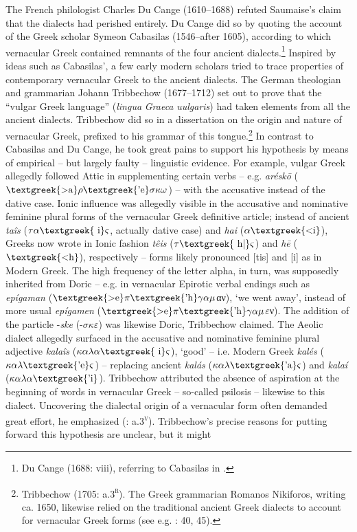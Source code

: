 \documentclass[output=paper]{langsci/langscibook}
\begin{document}
The French philologist Charles Du Cange (1610–1688) refuted Saumaise’s claim that the dialects had perished entirely. Du Cange did so by quoting the account of the Greek scholar Symeon Cabasilas (1546–after 1605), according to which vernacular Greek contained remnants of the four ancient dialects.\footnote{Du Cange (1688: viii), referring to Cabasilas in \citet[462]{Crusius1584}.} Inspired by ideas such as Cabasilas’, a few early modern scholars tried to trace properties of contemporary vernacular Greek to the ancient dialects. The German theologian and grammarian Johann Tribbechow (1677–1712) set out to prove that the “vulgar Greek language” (\textit{lingua} \textit{Graeca} \textit{uulgaris}) had taken elements from all the ancient dialects. Tribbechow did so in a dissertation on the origin and nature of vernacular Greek, prefixed to his grammar of this tongue.\footnote{Tribbechow (1705: a.3\textsc{\textsuperscript{r}}). The Greek grammarian Romanos Nikiforos, writing ca. 1650, likewise relied on the traditional ancient Greek dialects to account for vernacular Greek forms (see e.g. \citealt{Nikiforos1908}: 40, 45).} In contrast to Cabasilas and Du Cange, he took great pains to support his hypothesis by means of empirical – but largely faulty – linguistic evidence. For example, vulgar Greek allegedly followed Attic in supplementing certain verbs – e.g. \textit{aréskō} ($\text{\textgreek{>a}}\rho \text{\textgreek{'e}}\sigma \kappa \omega $) – with the accusative instead of the dative case. Ionic influence was allegedly visible in the accusative and nominative feminine plural forms of the vernacular Greek definitive article; instead of ancient \textit{taîs} ($\tau \alpha \text{\textgreek{~i}}\varsigma $, actually dative case) and \textit{hai} ($\alpha \text{\textgreek{<i}}$), Greeks now wrote in Ionic fashion \textit{têis} ($\tau \text{\textgreek{~h|}}\varsigma $) and \textit{hē} ($\text{\textgreek{<h}}$), respectively – forms likely pronounced [tis] and [i] as in Modern Greek. The high frequency of the letter alpha, in turn, was supposedly inherited from Doric – e.g. in vernacular Epirotic verbal endings such as \textit{epígaman} ($\text{\textgreek{>e}}\pi \text{\textgreek{'h}}\gamma \alpha \mu $αν), ‘we went away’, instead of more usual \textit{epígamen} ($\text{\textgreek{>e}}\pi \text{\textgreek{'h}}\gamma \alpha \mu $$\varepsilon $ν). The addition of the particle -\textit{ske} (-$\sigma \kappa \varepsilon $) was likewise Doric, Tribbechow claimed. The Aeolic dialect allegedly surfaced in the accusative and nominative feminine plural adjective \textit{kalaîs} ($\kappa \alpha \lambda \alpha \text{\textgreek{~i}}\varsigma $), ‘good’ – i.e. Modern Greek \textit{kalés} ($\kappa \alpha \lambda \text{\textgreek{'e}}\varsigma $) – replacing ancient \textit{kalás} ($\kappa \alpha \lambda \text{\textgreek{'a}}\varsigma $) and \textit{kalaí} ($\kappa \alpha \lambda \alpha \text{\textgreek{'i}}$). Tribbechow attributed the absence of aspiration at the beginning of words in vernacular Greek – so-called psilosis – likewise to this dialect. Uncovering the dialectal origin of a vernacular form often demanded great effort, he emphasized (\citealt{Tribbechow1705}: a.3\textsc{\textsuperscript{v}}). Tribbechow’s precise reasons for putting forward this hypothesis are unclear, but it might 
\end{document}
